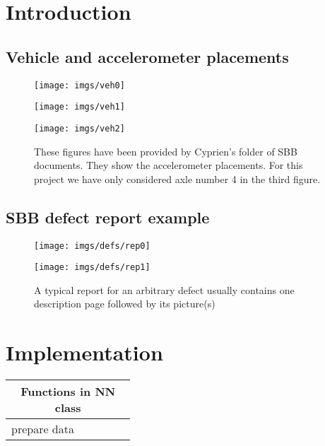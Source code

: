 \chapter{Introduction}

\section{Vehicle and accelerometer placements}
\label{figs:veh}
\begin{figure}[H]
	\centering
	\texttt{[image: imgs/veh0]}
	\label{fig:veh0}
	
	\texttt{[image: imgs/veh1]}
	\label{fig:veh1}
	
	\texttt{[image: imgs/veh2]}
	\caption{These figures have been provided by Cyprien's folder of SBB documents. They show the accelerometer placements. For this project we have only considered axle number 4 in the third figure.}
	\label{fig:veh2}
\end{figure}

\section{SBB defect report example}
\label{app:report}
\begin{figure}[H]
	\centering
	\texttt{[image: imgs/defs/rep0]}
	\caption{}
	\texttt{[image: imgs/defs/rep1]}
	\caption{A typical report for an arbitrary defect usually contains one description page followed by its picture(s)}
	\label{fig:veh2}
\end{figure}


\chapter{Implementation}
\begin{table}[H]
	\centering
	\begin{tabular}{l p{0.35\linewidth}} \hline
	\multicolumn{2}{c}{{\large \textbf{Functions in NN class}}}
		\\ \hline  
		prepare data      &  \\ \hline
	\end{tabular}
\end{table}
